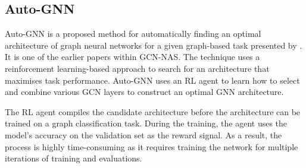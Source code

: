 \subsection{Auto-GNN}

\Gls{Auto-GNN} is a proposed method for automatically finding an optimal architecture of graph neural networks for a given graph-based task presented by \cite{zhou2019auto}. It is one of the earlier papers within GCN-NAS. The technique uses a reinforcement learning-based approach to search for an architecture that maximises task performance. Auto-GNN uses an RL agent to learn how to select and combine various GCN layers to construct an optimal GNN architecture. 

The RL agent compiles the candidate architecture before the architecture can be trained on a graph classification task. During the training, the agent uses the model's accuracy on the validation set as the reward signal. As a result, the process is highly time-consuming as it requires training the network for multiple iterations of training and evaluations. 